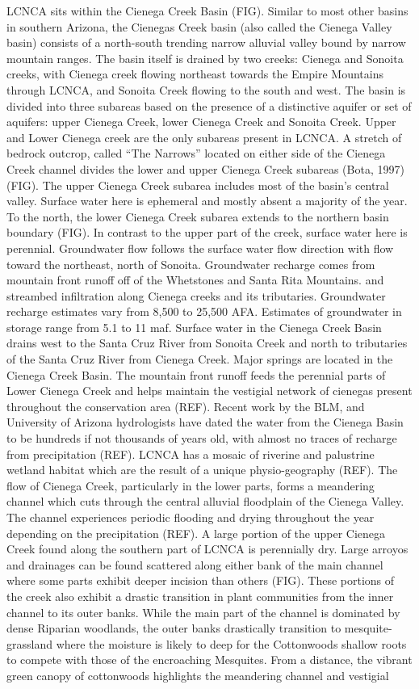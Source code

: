 \documentclass{article}
\begin{document}
LCNCA sits within the Cienega Creek Basin (FIG). Similar to most other basins in southern Arizona, the Cienegas Creek basin (also called the Cienega Valley basin) consists of a north-south trending narrow alluvial valley bound by narrow mountain ranges. The basin itself is drained by two creeks: Cienega and Sonoita creeks, with Cienega creek flowing northeast towards the Empire Mountains through LCNCA, and Sonoita Creek flowing to the south and west. The basin is divided into three subareas based on the presence of a distinctive aquifer or set of aquifers: upper Cienega Creek, lower Cienega Creek and Sonoita Creek. Upper and Lower Cienega creek are the only subareas present in LCNCA. A stretch of bedrock outcrop, called “The Narrows” located on either side of the Cienega Creek channel divides the lower and upper Cienega Creek subareas (Bota, 1997) (FIG). The upper Cienega Creek subarea includes most of the basin’s central valley. Surface water here is ephemeral and mostly absent a majority of the year. To the north, the lower Cienega Creek subarea extends to the northern basin boundary (FIG). In contrast to the upper part of the creek, surface water here is perennial.  Groundwater flow follows the surface water flow direction with flow toward the northeast, north of Sonoita. Groundwater recharge comes from mountain front runoff off of the Whetstones and Santa Rita Mountains. and streambed infiltration along Cienega creeks and its tributaries. Groundwater recharge estimates vary from 8,500 to 25,500 AFA. Estimates of groundwater in storage range from 5.1 to 11 maf. Surface water in the Cienega Creek Basin drains west to the Santa Cruz River from Sonoita Creek and north to tributaries of the Santa Cruz River from Cienega Creek. Major springs are located in the Cienega Creek Basin. The mountain front runoff feeds the perennial parts of Lower Cienega Creek and helps maintain the vestigial network of cienegas present throughout the conservation area (REF). Recent work by the BLM, and University of Arizona hydrologists have dated the water from the Cienega Basin to be hundreds if not thousands of years old, with almost no traces of recharge from precipitation (REF). LCNCA has a mosaic of riverine and palustrine wetland habitat which are the result of a unique physio-geography (REF). The flow of Cienega Creek, particularly in the lower parts, forms a meandering channel which cuts through the central alluvial floodplain of the Cienega Valley. The channel experiences periodic flooding and drying throughout the year depending on the precipitation (REF). A large portion of the upper Cienega Creek found along the southern part of LCNCA is perennially dry. Large arroyos and drainages can be found scattered along either bank of the main channel where some parts exhibit deeper incision than others (FIG). These portions of the creek also exhibit a drastic transition in plant communities from the inner channel to its outer banks. While the main part of the channel is dominated by dense Riparian woodlands, the outer banks drastically transition to mesquite-grassland where the moisture is likely to deep for the Cottonwoods shallow roots to compete with those of the encroaching Mesquites. From a distance, the vibrant green canopy of cottonwoods highlights the meandering channel and vestigial 
\end{document}
